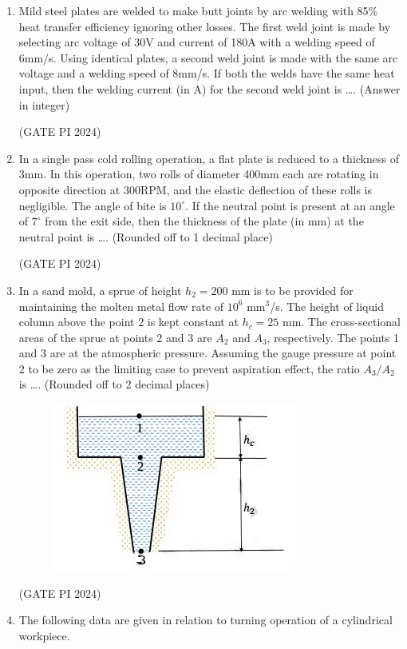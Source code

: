 \documentclass[journal,12pt,onecolumn]{IEEEtran}
\theoremstyle{remark}
\begin{document}
\begin{enumerate}
\item Mild steel plates are welded to make butt joints by arc welding with 85\% heat transfer efficiency ignoring other losses. The first weld joint is made by selecting arc voltage of 30V and current of 180A with a welding speed of 6mm/s. Using identical plates, a second weld joint is made with the same arc voltage and a welding speed of 8mm/s. If both the welds have the same heat input, then the welding current (in A) for the second weld joint is \dots . (Answer in integer)

\hfill (GATE PI 2024)

\item In a single pass cold rolling operation, a flat plate is reduced to a thickness of 3mm. In this operation, two rolls of diameter 400mm each are rotating in opposite direction at 300RPM, and the elastic deflection of these rolls is negligible. The angle of bite is $10^\circ$. If the neutral point is present at an angle of $7^\circ$ from the exit side, then the thickness of the plate (in mm) at the neutral point is \dots . (Rounded off to 1 decimal place)

\hfill (GATE PI 2024)

\item In a sand mold, a sprue of height $h_2 = 200$ mm is to be provided for maintaining the molten metal flow rate of $10^6$ mm$^3$/s. The height of liquid column above the point 2 is kept constant at $h_c = 25$ mm. The cross-sectional areas of the sprue at points 2 and 3 are $A_2$ and $A_3$, respectively. The points 1 and 3 are at the atmospheric pressure. Assuming the gauge pressure at point 2 to be zero as the limiting case to prevent aspiration effect, the ratio $A_3/A_2$ is \dots . (Rounded off to 2 decimal places)

\begin{figure}[H]
\centering
\includegraphics[width=0.5\columnwidth]{fig11.png}
\caption{}
\end{figure}

\hfill (GATE PI 2024)

\item The following data are given in relation to turning operation of a cylindrical workpiece.


\end{enumerate}
\end{document}

